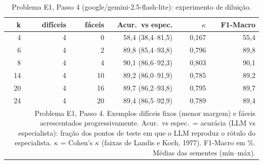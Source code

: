 \begin{table}[htbp]
\centering
\small
\caption{Problema E1, Passo 4 (google/gemini-2.5-flash-lite): experimento de diluição.}
\label{tab:bloco2_E1_passo4_diluicao_flashlite}
\begin{tabular}{rrrrrr}
\toprule
k & difíceis & fáceis & Acur.\ vs espec. & $\kappa$ & F1-Macro \\
\midrule
4 & 4 & 0 & 58,4 (38,4–81,5) & 0,167 & 55,4 \\
6 & 4 & 2 & 89,8 (85,4–93,8) & 0,796 & 89,8 \\
8 & 4 & 4 & 90,1 (86,6–92,3) & 0,803 & 90,1 \\
14 & 4 & 10 & 89,2 (86,0–91,9) & 0,785 & 89,2 \\
20 & 4 & 16 & 89,7 (86,2–93,8) & 0,795 & 89,7 \\
24 & 4 & 20 & 89,4 (86,5–92,9) & 0,789 & 89,4 \\
\bottomrule
\multicolumn{6}{p{0.95\linewidth}}{\footnotesize Problema E1, Passo 4. Exemplos difíceis fixos (menor margem) e fáceis acrescentados progressivamente. Acur.\ vs espec.\ = acurácia (LLM vs especialista): fração dos pontos de teste em que o LLM reproduz o rótulo do especialista. $\kappa$ = Cohen's $\kappa$ (faixas de Landis e Koch, 1977). F1-Macro em \%. Médias das sementes (mín–máx).} \\
\end{tabular}
\end{table}
